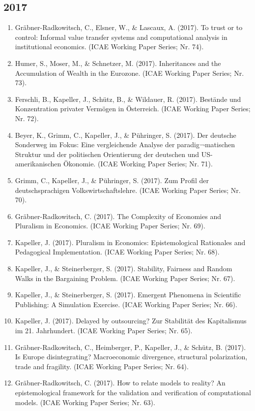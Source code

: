 \subsection*{2017}
\begin{enumerate}
	 \item Gräbner-Radkowitsch, C., Elsner, W., \& Lascaux, A. (2017). To trust or to control: Informal value transfer systems and computational analysis in institutional economics. (ICAE Working Paper Series; Nr. 74).
	 \item Humer, S., Moser, M., \& Schnetzer, M. (2017). Inheritances and the Accumulation of Wealth in the Eurozone. (ICAE Working Paper Series; Nr. 73).
	 \item Ferschli, B., Kapeller, J., Schütz, B., \& Wildauer, R. (2017). Bestände und Konzentration privater Vermögen in Österreich. (ICAE Working Paper Series; Nr. 72).
	 \item Beyer, K., Grimm, C., Kapeller, J., \& Pühringer, S. (2017). Der deutsche Sonderweg im Fokus: Eine vergleichende Analyse der paradig¬matischen Struktur und der politischen Orientierung der deutschen und US-amerikanischen Ökonomie. (ICAE Working Paper Series; Nr. 71).
	 \item Grimm, C., Kapeller, J., \& Pühringer, S. (2017). Zum Profil der deutschsprachigen Volkswirtschaftslehre. (ICAE Working Paper Series; Nr. 70).
	 \item Gräbner-Radkowitsch, C. (2017). The Complexity of Economies and Pluralism in Economics. (ICAE Working Paper Series; Nr. 69).
	 \item Kapeller, J. (2017). Pluralism in Economics: Epistemological Rationales and Pedagogical Implementation. (ICAE Working Paper Series; Nr. 68).
	 \item Kapeller, J., \& Steinerberger, S. (2017). Stability, Fairness and Random Walks in the Bargaining Problem. (ICAE Working Paper Series; Nr. 67).
	 \item Kapeller, J., \& Steinerberger, S. (2017). Emergent Phenomena in Scientific Publishing: A Simulation Exercise. (ICAE Working Paper Series; Nr. 66).
	 \item Kapeller, J. (2017). Delayed by outsourcing? Zur Stabilität des Kapitalismus im 21. Jahrhundert. (ICAE Working Paper Series; Nr. 65).
	 \item Gräbner-Radkowitsch, C., Heimberger, P., Kapeller, J., \& Schütz, B. (2017). Is Europe disintegrating? Macroeconomic divergence, structural polarization, trade and fragility. (ICAE Working Paper Series; Nr. 64).
	 \item Gräbner-Radkowitsch, C. (2017). How to relate models to reality? An epistemological framework for the validation and verification of computational models. (ICAE Working Paper Series; Nr. 63).

\end{enumerate}
